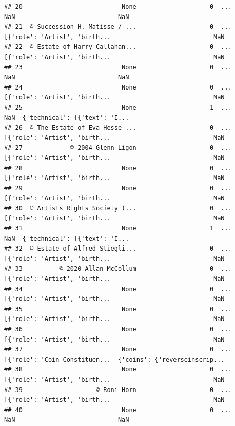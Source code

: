 \documentclass[
]{book}
\begin{document}
\begin{verbatim}
## 20                           None                    0  ...                            NaN                            NaN
## 21  © Succession H. Matisse / ...                    0  ...  [{'role': 'Artist', 'birth...                            NaN
## 22  © Estate of Harry Callahan...                    0  ...  [{'role': 'Artist', 'birth...                            NaN
## 23                           None                    0  ...                            NaN                            NaN
## 24                           None                    0  ...  [{'role': 'Artist', 'birth...                            NaN
## 25                           None                    1  ...                            NaN  {'technical': [{'text': 'I...
## 26  © The Estate of Eva Hesse ...                    0  ...  [{'role': 'Artist', 'birth...                            NaN
## 27             © 2004 Glenn Ligon                    0  ...  [{'role': 'Artist', 'birth...                            NaN
## 28                           None                    0  ...  [{'role': 'Artist', 'birth...                            NaN
## 29                           None                    0  ...  [{'role': 'Artist', 'birth...                            NaN
## 30  © Artists Rights Society (...                    0  ...  [{'role': 'Artist', 'birth...                            NaN
## 31                           None                    1  ...                            NaN  {'technical': [{'text': 'I...
## 32  © Estate of Alfred Stiegli...                    0  ...  [{'role': 'Artist', 'birth...                            NaN
## 33          © 2020 Allan McCollum                    0  ...  [{'role': 'Artist', 'birth...                            NaN
## 34                           None                    0  ...  [{'role': 'Artist', 'birth...                            NaN
## 35                           None                    0  ...  [{'role': 'Artist', 'birth...                            NaN
## 36                           None                    0  ...  [{'role': 'Artist', 'birth...                            NaN
## 37                           None                    0  ...  [{'role': 'Coin Constituen...  {'coins': {'reverseinscrip...
## 38                           None                    0  ...  [{'role': 'Artist', 'birth...                            NaN
## 39                    © Roni Horn                    0  ...  [{'role': 'Artist', 'birth...                            NaN
## 40                           None                    0  ...                            NaN                            NaN

\end{verbatim}
\end{document}
